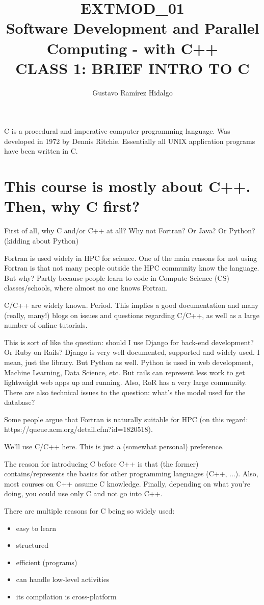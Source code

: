 \documentclass[11pt]{article}
\title{\textbf{EXTMOD\_01 \\ Software Development and Parallel Computing - with C++} \\ CLASS 1: BRIEF INTRO TO C}
\author{Gustavo Ram\'irez Hidalgo\\}
\date{}
\begin{document}
\maketitle

C is a procedural and imperative computer programming language. Was developed in 1972 by Dennis Ritchie. Essentially all UNIX application programs have been written in C.

\section{This course is mostly about C++. Then, why C first?}

First of all, why C and/or C++ at all? Why not Fortran? Or Java? Or Python? (kidding about Python)

Fortran is used widely in HPC for science. One of the main reasons for not using Fortran is that not many people outside the HPC community know the language. But why? Partly because people learn to code in Compute Science (CS) classes/schools, where almost no one knows Fortran.

C/C++ are widely known. Period. This implies a good documentation and many (really, many!) blogs on issues and questions regarding C/C++, as well as a large number of online tutorials.

This is sort of like the question: should I use Django for back-end development? Or Ruby on Rails? Django is very well documented, supported and widely used. I mean, just the library. But Python as well. Python is used in web development, Machine Learning, Data Science, etc. But rails can represent less work to get lightweight web apps up and running. Also, RoR has a very large community. There are also technical issues to the question: what's the model used for the database?

Some people argue that Fortran is naturally suitable for HPC (on this regard: https://queue.acm.org/detail.cfm?id=1820518).

We'll use C/C++ here. This is just a (somewhat personal) preference.

The reason for introducing C before C++ is that (the former) contains/represents the basics for other programming languages (C++, ...). Also, most courses on C++ assume C knowledge. Finally, depending on what you're doing, you could use only C and not go into C++.

There are multiple reasons for C being so widely used:

\begin{itemize}
\item easy to learn
\item structured
\item efficient (programs)
\item can handle low-level activities
\item its compilation is cross-platform
\end{itemize}
\end{document}
